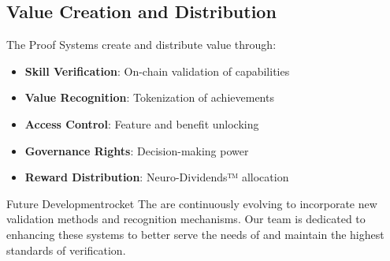 \begin{center}
\end{center}

\subsection{Value Creation and Distribution}

The Proof Systems create and distribute value through:

\begin{itemize}[leftmargin=*]
\item \textbf{Skill Verification}: On-chain validation of capabilities
\item \textbf{Value Recognition}: Tokenization of achievements
\item \textbf{Access Control}: Feature and benefit unlocking
\item \textbf{Governance Rights}: Decision-making power
\item \textbf{Reward Distribution}: Neuro-Dividends™ allocation
\end{itemize}

\begin{mfai-box-scale}{Future Development}{rocket}
The  are continuously evolving to incorporate new validation methods and recognition mechanisms. Our team is dedicated to enhancing these systems to better serve the needs of  and maintain the highest standards of verification.
\end{mfai-box-scale}

\newpage 